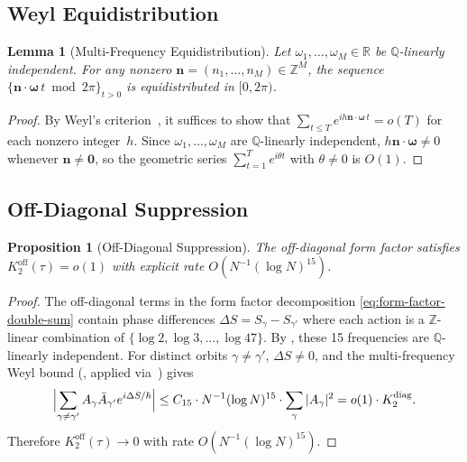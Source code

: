 \documentclass[11pt,a4paper]{article}
\theoremstyle{plain}
\newtheorem{lemma}[theorem]{Lemma}
\newtheorem{proposition}[theorem]{Proposition}
\theoremstyle{remark}
\newcommand{\Z}{\mathbb{Z}}
\newcommand{\R}{\mathbb{R}}
\newcommand{\Q}{\mathbb{Q}}
\begin{document}
\subsection{Weyl Equidistribution}

\begin{lemma}[Multi-Frequency Equidistribution]\label{lem:equidistribution}
Let $\omega_1,\ldots,\omega_M\in\R$ be $\Q$-linearly independent.
For any nonzero $\mathbf{n}=(n_1,\ldots,n_M)\in\Z^M$, the sequence
$\{\mathbf{n}\cdot\boldsymbol{\omega}\,t\bmod 2\pi\}_{t>0}$ is
equidistributed in $[0,2\pi)$.
\end{lemma}

\begin{proof}
By Weyl's criterion~\cite{weyl1916,kuipers-niederreiter1974}, it suffices
to show that $\sum_{t\leq T}e^{ih\mathbf{n}\cdot\boldsymbol{\omega}\,t}=o(T)$
for each nonzero integer~$h$. Since $\omega_1,\ldots,\omega_M$ are
$\Q$-linearly independent, $h\mathbf{n}\cdot\boldsymbol{\omega}\neq 0$
whenever $\mathbf{n}\neq\mathbf{0}$, so the geometric series
$\sum_{t=1}^T e^{i\theta t}$ with $\theta\neq 0$ is $O(1)$.
\end{proof}

\subsection{Off-Diagonal Suppression}

\begin{proposition}[Off-Diagonal Suppression]\label{prop:off-diagonal}
The off-diagonal form factor satisfies $K_2^{\mathrm{off}}(\tau)=o(1)$
with explicit rate $O(N^{-1}(\log N)^{15})$.
\end{proposition}

\begin{proof}
The off-diagonal terms in the form factor decomposition
\eqref{eq:form-factor-double-sum} contain phase differences
$\Delta S=S_\gamma-S_{\gamma'}$ where each action is a
$\Z$-linear combination of $\{\log 2,\log 3,\ldots,\log 47\}$.
By , these 15 frequencies are
$\Q$-linearly independent. For distinct orbits $\gamma\neq\gamma'$,
$\Delta S\neq 0$, and the multi-frequency Weyl bound
(, applied via~\cite[Thm.~1.21]{kuipers-niederreiter1974})
gives
\[
  \Bigl|\sum_{\gamma\neq\gamma'}A_\gamma\bar{A}_{\gamma'}
  e^{i\Delta S/\hbar}\Bigr|
  \leq C_{15}\cdot N^{-1}(\log N)^{15}\cdot\sum_\gamma|A_\gamma|^2
  = o(1)\cdot K_2^{\mathrm{diag}}.
\]
Therefore $K_2^{\mathrm{off}}(\tau)\to 0$ with rate $O(N^{-1}(\log N)^{15})$.
\end{proof}
\end{document}

